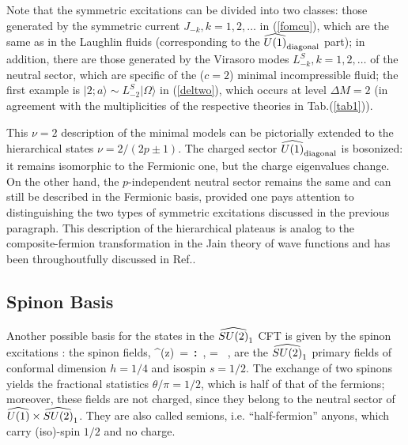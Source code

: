 Note that the symmetric excitations can be divided
into two classes: those generated by the symmetric current
$J_{-k}, k=1,2,\dots$ in (\ref{fomcu}), which are the same as in
the Laughlin fluids (corresponding to the $\u1_{\rm diagonal}$ part);
in addition, there are those generated by the Virasoro modes 
$L^S_{-k}, k=1,2,\dots$ of the neutral sector, which are specific
of the ($c=2$) minimal incompressible fluid; the first example is
$\vert 2;a \rangle\sim L_{-2}^S \vert \Omega \rangle$ 
in (\ref{deltwo}), which occurs at level $\Delta M =2$
(in agreement with the multiplicities
of the respective theories in Tab.(\ref{tab1})).

This $\nu=2$ description of the minimal models can be pictorially 
extended to the hierarchical states $\nu=2/(2p\pm 1)$. The charged
sector $\u1_{\rm diagonal}$ is bosonized: it remains isomorphic to
the Fermionic one, but the charge eigenvalues change. 
On the other hand, the $p$-independent neutral sector remains 
the same and can still be 
described in the Fermionic basis, provided one pays attention to
distinguishing the two types of symmetric excitations discussed in
the previous paragraph.
This description of the hierarchical plateaus is analog to
the composite-fermion transformation in the Jain theory 
of wave functions \cite{jain} and has been throughoutfully discussed
in Ref.\cite{cmsz}. 




\subsection{Spinon Basis}


Another possible basis for the states in the $\su2$ CFT
is given by the spinon excitations \cite{spinon}: the spinon fields,
\beq
\Phi^{\alpha}(z)\ =\ {\bf :}\ , \qquad \alpha = \ ,
\eeq
are the $\su2$ primary fields of conformal dimension $h=1/4$ and
isospin $s=1/2$. The exchange of two spinons yields
the fractional statistics $\theta/\pi = 1/2$, which is half of 
that of the fermions; moreover, these fields are not charged, 
since they belong to the neutral sector of $\u1\times\su2$.
They are also called semions, i.e. ``half-fermion'' anyons,
which carry (iso)-spin $1/2$ and no charge.

